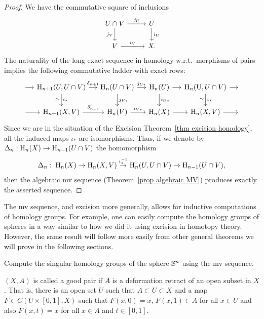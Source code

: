\begin{proof}
    We have the commutative square of inclusions
    \[\begin{tikzcd}
        U\cap V\arrow[r,"j_U"]\arrow[d,"j_V",swap] & U\arrow[d,"i_U"]\\
        V\arrow[r,"i_V"]& X.
    \end{tikzcd}\]
    The naturality of the long exact sequence in homology w.r.t.\ morphisms of pairs implies the following commutative ladder with exact rows:
    \[\begin{tikzcd}[column sep=small]
        ~\arrow[r]& \rmH_{n+1}(U,U\cap V)\arrow[r,"\delta_{n+1}"]\arrow[d,"\iota_\ast","\cong"'] & \rmH_n(U\cap V) \arrow[r,"j_{U\ast}"]\arrow[d,"j_{V\ast}"] & \rmH_n(U)\arrow[d,"i_{U\ast}"]\arrow[r] & \rmH_{n}(\U,U\cap V)\arrow[d,"\iota_\ast","\cong"']\arrow[r]&~ \\
       ~\arrow[r] & \rmH_{n+1}(X,V)\arrow[r,"\delta_{n+1}'"] & \rmH_n(V)\arrow[r,"i_{V\ast}"] &\rmH_n(X) \arrow[r] &\rmH_{n}(X,V)\arrow[r]&~
    \end{tikzcd}\]
    Since we are in the situation of the Excision Theorem~\ref{thm excision homology}, all the induced maps $\iota_\ast$ are isomorphisms. Thus, if we denote by $\Delta_n:\mathrm{H}_n(X)\to \mathrm{H}_{n-1}(U\cap V)$ the homomorphism
    \[\Delta_n:\;\mathrm{H}_n(X)\to \mathrm{H}_n(X,V)\overset{\iota_\ast^{-1}}{\to }\mathrm{H}_n(U,U\cap V)\to \mathrm{H}_{n-1}(U\cap V),\]
    then the algebraic \gls{mv} sequence (Theorem~\ref{prop algebraic MV}) produces exactly the asserted sequence.
\end{proof}

The \gls{mv} sequence, and excision more generally, allows for inductive computations of homology groups. For example, one can easily compute the homology groups of spheres in a way similar to how we did it using excision in homotopy theory. However, the same result will follow more easily from other general theorems we will prove in the following sections.

\begin{xca}
    Compute the singular homology groups of the sphere $\mathbb{S}^n$ using the \gls{mv} sequence.
\end{xca}


\begin{defn}
    $(X,A)$ is called a good pair if $A$ is a deformation retract of an open subset in $X$. That is, there is an open set $U$ such that $A\subset U\subset X$ and a map $F\in C(U\times[0,1],X)$ such that $F(x,0)=x$, $F(x,1)\in A$ for all $x\in U$ and also $F(x,t)=x$ for all $x\in A$ and $t\in [0,1]$.
\end{defn}

